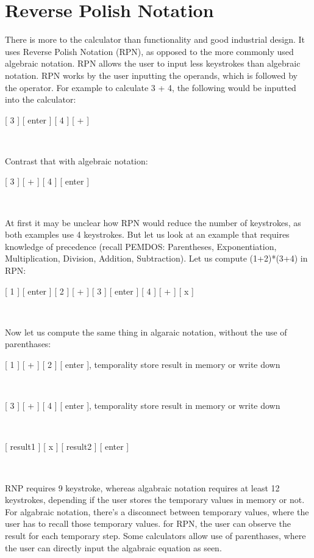 \documentclass{article}
\begin{document}
\section{Reverse Polish Notation}
\label{Reverse Polish Notation}

There is more to the calculator than functionality and good industrial design.  It uses Reverse Polish Notation (RPN), as opposed to the more commonly used algebraic notation.  RPN allows the user to input less keystrokes than algebraic notation.  RPN works by the user inputting the operands, which is followed by the operator.  For example to calculate 3 + 4, the following would be inputted into the calculator:\\

\centerline{[ 3 ] [ enter ] [ 4 ] [ + ]}
\

Contrast that with algebraic notation:\\

\centerline{[ 3 ] [ + ] [ 4 ] [ enter ]}
\

At first it may be unclear how RPN would reduce the number of keystrokes, as both examples use 4 keystrokes.  But let us look at an example that requires knowledge of precedence (recall PEMDOS: Parentheses, Exponentiation, Multiplication, Division, Addition, Subtraction).  Let us compute (1+2)*(3+4) in RPN:\\

\centerline{[ 1 ] [ enter ] [ 2 ] [ + ] [ 3 ] [ enter ] [ 4 ] [ + ] [ x ]}
\

Now let us compute the same thing in algaraic notation, without the use of parenthases:\\

\centerline{[ 1 ] [ + ] [ 2 ] [ enter ], temporality store result in memory or write down}
\

\centerline{[ 3 ] [ + ] [ 4 ] [ enter ], temporality store result in memory or write down}
\

\centerline{[ result1 ] [ x ] [ result2 ] [ enter ]}
\

RNP requires 9 keystroke, whereas algabraic notation requires at least 12 keystrokes, depending if the user stores the temporary values in memory or not.  For algabraic notation, there's a disconnect between temporary values, where the user has to recall those temporary values. for RPN, the user can observe the result for each temporary step.  Some calculators allow use of parenthases, where the user can directly input the algabraic equation as seen. \\
\end{document}
